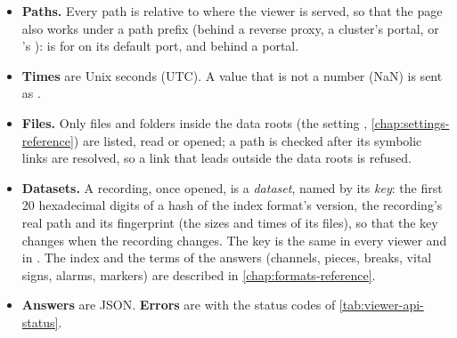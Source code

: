 \begin{itemize}
\item \textbf{Paths.} Every path is relative to where the viewer is served, so that the page
  also works under a path prefix (behind a reverse proxy, a cluster's portal, or \md{}'s
  ):  is
   for  on its default port, and
   behind a portal.
\item \textbf{Times} are Unix seconds (UTC). A value that is not a number (NaN) is sent as
  .
\item \textbf{Files.} Only files and folders inside the data roots (the setting
  , \cref{chap:settings-reference}) are listed, read or opened; a path is
  checked after its symbolic links are resolved, so a link that leads outside the data roots is
  refused.
\item \textbf{Datasets.} A recording, once opened, is a \emph{dataset}, named by its
  \emph{key}: the first 20 hexadecimal digits of a hash of the index format's version, the
  recording's real path and its fingerprint (the sizes and times of its files), so that the key
  changes when the recording changes. The key is the same in every viewer and in \md{}. The
  index and the terms of the answers (channels, pieces, breaks, vital signs, alarms, markers)
  are described in \cref{chap:formats-reference}.
\item \textbf{Answers} are JSON. \textbf{Errors} are  with the status
  codes of \cref{tab:viewer-api-status}.
\end{itemize}

